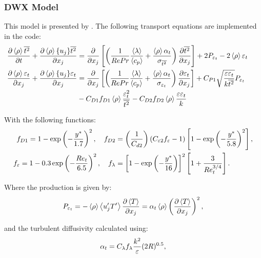 \subsubsection{DWX Model}
This model is presented by \cite{deng2001near}.
The following transport equations are implemented in the code:
\begin{equation} \label{eq:ktDeng}
\begin{split}
\frac{\partial \left<{\rho}\right>\overline{t^2}}{\partial {t}} +\frac{\partial \left<{\rho}\right>\{{u_j}\}\overline{t^2}}{\partial {x_j}} &= \frac{\partial }{\partial {x_j}}\left[ \left(\frac{1}{RePr}\frac{\left<{\lambda}\right>}{\left<{c_p}\right>} + \frac{\left<{\rho}\right>\alpha_t}{\sigma_{\overline{t^2}}}\right)\frac{\partial \overline{t^2}}{\partial x_j}\right] + 2 P_{{\varepsilon}_t}- 2 \left<{\rho}\right> \varepsilon_t \\
\frac{\partial \left<{\rho}\right>\varepsilon_t}{\partial {x_j}} + \frac{\partial \left<{\rho}\right>\{{u_j}\}\varepsilon_t}{\partial {x_j}} &= \frac{\partial}{\partial x_j}\left[\left(\frac{1}{RePr}\frac{\left<{\lambda}\right>}{\left<{c_p}\right>} + \frac{\left<{\rho}\right>\alpha_t}{\sigma_{\varepsilon_t}}\right)\frac{\partial \varepsilon_t}{\partial x_j}\right] + C_{P1}\sqrt{\frac{{\varepsilon}{\varepsilon}_t}{k\overline{t^2}}} P_{{\varepsilon}_t} \qquad \\ &- C_{D1} f_{D1}\left<{\rho}\right>\frac{{\varepsilon}_t^2}{\overline{t^2}}  - C_{D2} f_{D2}\left<{\rho}\right>\frac{{\varepsilon}{\varepsilon}_t}{k}  
\end{split}
\end{equation}

With the following functions:
\begin{equation}
\begin{split}
f_{D1} = 1-\exp\left(-\frac{y^*}{1.7}\right)^2,\quad f_{D2} &= \left(\frac{1}{C_{d2}}\right)(C_{{\varepsilon}2}f_{\varepsilon}-1)\left[1-\exp\left(-\frac{y^*}{5.8}\right)^2\right], \\
f_{\varepsilon} = 1-0.3\exp\left(-\frac{Re_t}{6.5}\right)^2, \quad f_\lambda &= \left[1-\exp\left(-\frac{y^*}{16}\right)\right]^2\left[1+\frac{3}{Re_t^{3/4}}\right].
\end{split}
\end{equation}

Where the production is given by:
\begin{equation}
P_{{\varepsilon}_t}=-\left<{\rho}\right> \left<{u'_j T'}\right> \frac{\partial \left<{T}\right>}{ \partial x_j}= \alpha_t \left<{\rho}\right> \left(\frac{ \partial \left<{T}\right>}{\partial x_j}\right)^2,
\end{equation} 

and the turbulent diffusivity calculated using:
\begin{equation}
\alpha_t = C_\lambda f_\lambda \frac{k^2}{{\varepsilon}}(2R)^{0.5},
\end{equation} 


